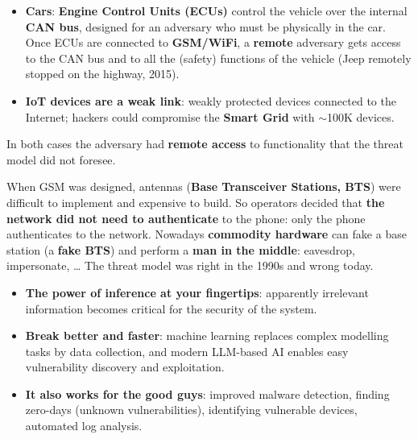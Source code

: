 \begin{exbox}[title={Unforeseen access capabilities: from cable to the air, IoT}]
\begin{itemize}
  \item \textbf{Cars}: \textbf{Engine Control Units (ECUs)} control the vehicle over the internal
        \textbf{CAN bus}, designed for an adversary who must be physically in the car. Once ECUs
        are connected to \textbf{GSM/WiFi}, a \textbf{remote} adversary gets access to the CAN bus
        and to all the (safety) functions of the vehicle (Jeep remotely stopped on the highway,
        2015).
  \item \textbf{IoT devices are a weak link}: weakly protected devices connected to the Internet;
        hackers could compromise the \textbf{Smart Grid} with $\sim$100K devices.
\end{itemize}
In both cases the adversary had \textbf{remote access} to functionality that the threat model did
not foresee.
\end{exbox}

\begin{exbox}[title={Unforeseen capabilities: unilateral authentication in GSM}]
When GSM was designed, antennas (\textbf{Base Transceiver Stations, BTS}) were difficult to
implement and expensive to build. So operators decided that \textbf{the network did not need to
authenticate} to the phone: only the phone authenticates to the network. Nowadays
\textbf{commodity hardware} can fake a base station (a \textbf{fake BTS}) and perform a
\textbf{man in the middle}: eavesdrop, impersonate, \ldots{} The threat model was right in the
1990s and wrong today.
\end{exbox}

\begin{exbox}[title={Unforeseen computational/algorithmic capabilities: the ML and AI revolution}]
\begin{itemize}
  \item \textbf{The power of inference at your fingertips}: apparently irrelevant information
        becomes critical for the security of the system.
  \item \textbf{Break better and faster}: machine learning replaces complex modelling tasks by
        data collection, and modern LLM-based AI enables easy vulnerability discovery and
        exploitation.
  \item \textbf{It also works for the good guys}: improved malware detection, finding zero-days
        (unknown vulnerabilities), identifying vulnerable devices, automated log analysis.
\end{itemize}
\end{exbox}

